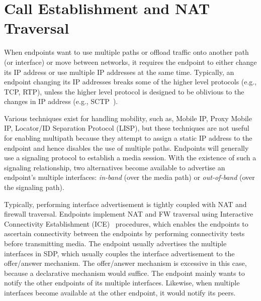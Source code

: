 \section{Call Establishment and NAT Traversal}

When endpoints want to use multiple paths or offload traffic onto another path
(or interface) or move between networks, it requires the endpoint to either
change its IP address or use multiple IP addresses at the same time.
Typically, an endpoint changing its IP addresses breaks some of the higher
level protocols (e.g., TCP, RTP), unless the higher level protocol is designed
to be oblivious to the changes in IP address (e.g., SCTP~\cite{rfc4960}).

Various techniques exist for handling mobility, such as, Mobile IP, Proxy
Mobile IP, Locator/ID Separation Protocol (LISP), but these techniques are not
useful for enabling multipath because they attempt to assign a static IP
address to the endpoint and hence disables the use of multiple paths.
Endpoints will generally use a signaling protocol to establish a media
session. With the existence of such a signaling relationship, two alternatives
become available to advertise an endpoint's multiple interfaces:
\emph{in-band} (over the media path) or \emph{out-of-band} (over the signaling
path).

Typically, performing interface advertisement is tightly coupled with NAT and
firewall traversal. Endpoints implement NAT and FW traversal using Interactive
Connectivity Establishment (ICE)~\cite{rfc5245} procedures, which enables the
endpoints to ascertain connectivity between the endpoints by performing
connectivity tests before transmitting media. The endpoint usually advertises
the multiple interfaces in SDP, which usually couples the interface
advertisement to the offer/answer mechanism. The offer/answer mechanism is
excessive in this case, because a declarative mechanism would suffice. The
endpoint mainly wants to notify the other endpoints of its multiple
interfaces. Likewise, when multiple interfaces become available at the other
endpoint, it would notify its peers.

